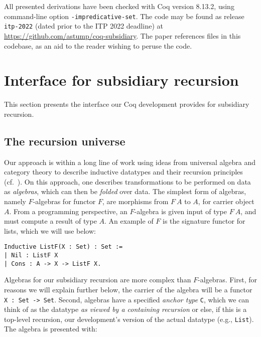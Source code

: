 \documentclass[a4paper,USenglish]{lipics-v2021}
\begin{document}
All presented derivations have been checked with Coq version 8.13.2,
using command-line option \verb|-impredicative-set|.  The code may be
found as release \verb|itp-2022| (dated prior to the ITP 2022
deadline) at \url{https://github.com/astump/coq-subsidiary}.  The
paper references files in this codebase, as an aid to the reader
wishing to peruse the code.

\section{Interface for subsidiary recursion}
\label{sec:interface}

This section presents the interface our Coq development provides
for subsidiary recursion.

\subsection{The recursion universe}
\label{sec:recu}

Our approach is within a long line of work using ideas from universal
algebra and category theory to describe inductive datatypes and their
recursion principles (cf.~\cite{traytel12,cockett92,hagino87}).  On this approach, one describes transformations
to be performed on data as \emph{algebras}, which can then be
\textit{folded} over data.  The simplest form of algebras, namely
$F$-algebras for functor $F$, are morphisms from $F\ A$ to $A$, for carrier object
$A$.  From a programming perspective, an $F$-algebra is given input of
type $F\ A$, and must compute a result of type $A$.  An example of $F$
is the signature functor for lists, which we will use below:

\begin{verbatim}
Inductive ListF(X : Set) : Set :=
| Nil : ListF X
| Cons : A -> X -> ListF X.
\end{verbatim}

Algebras for our subsidiary recursion are more complex than $F$-algebras.  First, for
reasons we will explain further below, the carrier of the algebra will
be a functor \verb|X : Set -> Set|.  Second, algebras have a specified
\emph{anchor type} \verb|C|, which we can think of as the datatype
\emph{as viewed by a containing recursion} or else, if this is a
top-level recursion, our development's version of the actual datatype
(e.g., \verb|List|).  The algebra is presented with:
\end{document}
